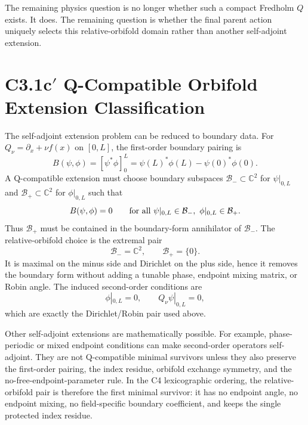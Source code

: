 \documentclass[11pt]{article}
\begin{document}
The remaining physics question is no longer whether such a compact Fredholm
$Q$ exists.  It does.  The remaining question is whether the final parent
action uniquely selects this relative-orbifold domain rather than another
self-adjoint extension.

\section{C3.1c$'$ Q-Compatible Orbifold Extension Classification}
The self-adjoint extension problem can be reduced to boundary data.  For
$Q_\nu=\partial_x+\nu f(x)$ on $[0,L]$, the first-order boundary pairing is
\begin{equation}
B(\psi,\phi)=\left[\psi^*\phi\right]_0^L
=\psi(L)^*\phi(L)-\psi(0)^*\phi(0).
\end{equation}
A Q-compatible extension must choose boundary subspaces
$\mathcal B_-\subset\mathbb C^2$ for $\psi|_{0,L}$ and
$\mathcal B_+\subset\mathbb C^2$ for $\phi|_{0,L}$ such that
\begin{equation}
B(\psi,\phi)=0
\qquad
\hbox{for all }\psi|_{0,L}\in\mathcal B_-,
\ \phi|_{0,L}\in\mathcal B_+ .
\end{equation}
Thus $\mathcal B_+$ must be contained in the boundary-form annihilator of
$\mathcal B_-$.  The relative-orbifold choice is the extremal pair
\begin{equation}
\mathcal B_-=\mathbb C^2,\qquad \mathcal B_+=\{0\}.
\end{equation}
It is maximal on the minus side and Dirichlet on the plus side, hence it removes
the boundary form without adding a tunable phase, endpoint mixing matrix, or
Robin angle.  The induced second-order conditions are
\begin{equation}
\phi|_{0,L}=0,\qquad Q_\nu\psi|_{0,L}=0,
\end{equation}
which are exactly the Dirichlet/Robin pair used above.

Other self-adjoint extensions are mathematically possible.  For example,
phase-periodic or mixed endpoint conditions can make second-order operators
self-adjoint.  They are not Q-compatible minimal survivors unless they also
preserve the first-order pairing, the index residue, orbifold exchange symmetry,
and the no-free-endpoint-parameter rule.  In the C4 lexicographic ordering, the
relative-orbifold pair is therefore the first minimal survivor: it has no
endpoint angle, no endpoint mixing, no field-specific boundary coefficient, and
keeps the single protected index residue.
\end{document}
